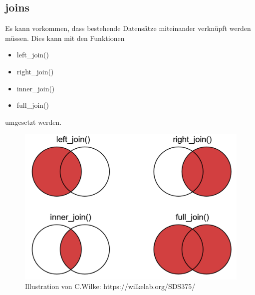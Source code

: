 \documentclass[
]{article}
\providecommand{\tightlist}{%
  \setlength{\itemsep}{0pt}\setlength{\parskip}{0pt}}
\begin{document}
\hypertarget{joins}{%
\subsection{joins}\label{joins}}

Es kann vorkommen, dass bestehende Datensätze miteinander verknüpft werden müssen. Dies kann mit den Funktionen

\begin{itemize}
\tightlist
\item
  left\_join()
\item
  right\_join()
\item
  inner\_join()
\item
  full\_join()
\end{itemize}

umgesetzt werden.

\begin{figure}

{\centering \includegraphics[width=12.38in]{images/044} 

}

\caption{Illustration von C.Wilke: https://wilkelab.org/SDS375/}\label{fig:unnamed-chunk-146}
\end{figure}
\end{document}
